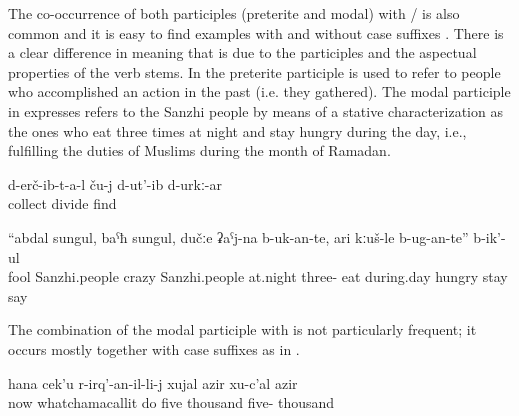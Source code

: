 The co-occurrence of both participles (preterite and modal) with \slash{} is also common and it is easy to find examples with  and without case suffixes . There is a clear difference in meaning that is due to the participles and the aspectual properties of the verb stems. In  the preterite participle is used to refer to people who accomplished an action in the past (i.e. they gathered). The modal participle in  expresses refers to the Sanzhi people by means of a stative characterization as the ones who eat three times at night and stay hungry during the day, i.e., fulfilling the duties of Muslims during the month of Ramadan.
%
\begin{exe}
	\ex	\label{ex:‎‎‎The ones that gathered (the food) probably divided it among themselves}
	\gll	d-erč-ib-t-a-l	ču-j	d-ut'-ib	d-urkː-ar\\
		collect		divide	find\\
	\glt	{}

	\ex	\label{ex:‎‎Foolish Sanzhi people, crazy Sаnzhi people, at night they eat three times, and during day they stay hungry they said}
	\gll	``abdal	sungul,		baˁħ	sungul,		dučːe		ʡaˁj-na	b-uk-an-te, 					ari 		kːuš-le		b-ug-an-te'' 							b-ik'-ul\\
		fool	Sanzhi.people	crazy	Sanzhi.people	at.night	three-	eat 	during.day	hungry	\tsc{hpl-}stay 	say\\
	\glt	{}
\end{exe}


The combination of the modal participle with  is not particularly frequent; it occurs mostly together with case suffixes as in . 

\begin{exe}
	\ex	\label{ex:‎now for the one who operates her 5000, 50000 rubles}
	\gll	hana	cek'u	r-irq'-an-il-li-j	xujal	azir	xu-c'al	azir\\
		now	whatchamacallit	do	five	thousand	five-	thousand\\
	\glt	{}
\end{exe}

